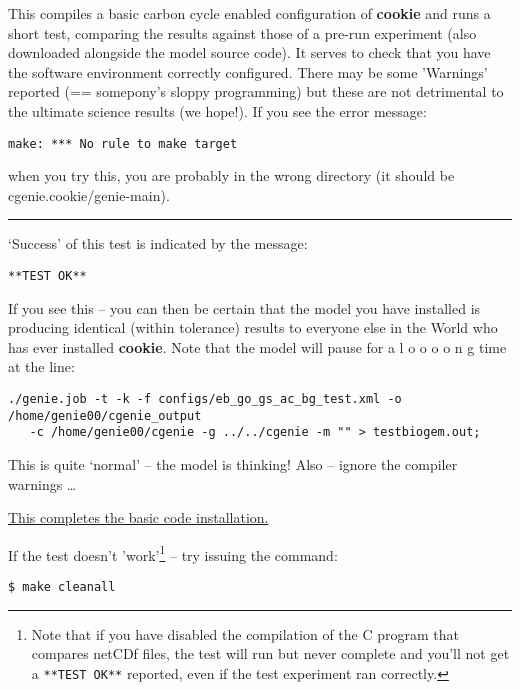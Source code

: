 \noindent This compiles a basic carbon cycle enabled configuration of \textbf{cookie} and runs a short test, comparing the results against those of a pre-run experiment (also downloaded alongside the model source code). It serves to check that you have the software environment correctly configured. There may be some ’Warnings’ reported (== somepony’s sloppy programming) but these are not detrimental to the ultimate science results (we hope!).
\vspace{1mm}
If you see the error message:
\vspace{-2mm}\begin{verbatim}
make: *** No rule to make target 
\end{verbatim}\vspace{-2mm}
when you try this, you are probably in the wrong directory (it should be \textsf{\footnotesize cgenie.cookie/genie-main}).

\vspace{1mm}\noindent\rule{4cm}{0.5pt}\vspace{2mm}

\noindent ‘Success’ of this test is indicated by the message:
\vspace{-1mm}
\small\begin{verbatim}
**TEST OK**
\end{verbatim}\normalsize
\vspace{-1mm}

\noindent If you see this -- you can then be certain that the model you have installed is producing identical (within tolerance) results to everyone else in the World who has ever installed \textbf{cookie}. Note that the model will pause for a l o o o o n g time at the line:
\vspace{-2mm}
\small\begin{verbatim}
./genie.job -t -k -f configs/eb_go_gs_ac_bg_test.xml -o /home/genie00/cgenie_output
   -c /home/genie00/cgenie -g ../../cgenie -m "" > testbiogem.out;
\end{verbatim}\normalsize
\vspace{-2mm}

\noindent This is quite ‘normal’ – the model is thinking! Also -- ignore the compiler warnings … 

\vspace{1mm}
\noindent \uline{This completes the basic code installation.}

\vspace{1mm}
\noindent If the test doesn't 'work'\footnote{Note that if you have disabled the compilation of the C program that compares netCDf files, the test will run but never complete and you'll not get a \texttt{**TEST OK**} reported, even if the test experiment ran correctly.} -- try issuing the command:
\vspace{-2mm}\begin{verbatim}
$ make cleanall
\end{verbatim}\vspace{-2mm}

